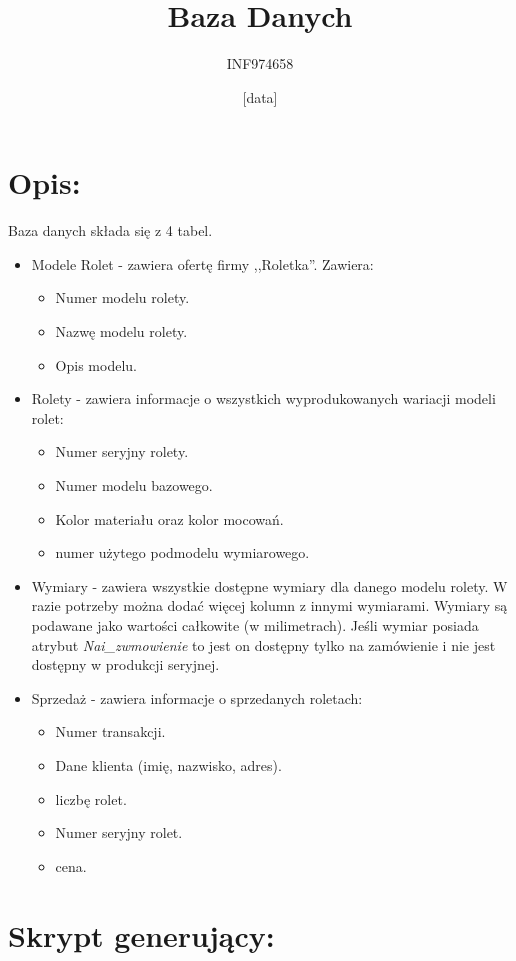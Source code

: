 \documentclass[a4paper,12pt]{article}
\title{Baza Danych}
\author{INF974658}
\date{[data]}
\begin{document}
\section{Opis:}

Baza danych składa się z 4 tabel.
\begin{itemize}
		\item Modele Rolet - zawiera ofertę firmy ,,Roletka''. Zawiera:
				\begin{itemize}
						\item Numer modelu rolety.
						\item Nazwę modelu rolety.
						\item Opis modelu.
				\end{itemize}
		\item Rolety - zawiera informacje o wszystkich wyprodukowanych wariacji modeli rolet:
				\begin{itemize}
						\item Numer seryjny rolety.
						\item Numer modelu bazowego.
						\item Kolor materiału oraz kolor mocowań.
						\item numer użytego podmodelu wymiarowego.
				\end{itemize}
		\item Wymiary - zawiera wszystkie dostępne wymiary dla danego modelu rolety. W razie potrzeby
				można dodać więcej kolumn z innymi wymiarami. Wymiary są podawane jako wartości całkowite
				(w milimetrach). Jeśli wymiar posiada atrybut \emph{Nai\_zwmowienie} to jest on dostępny tylko
				na zamówienie i nie jest dostępny w produkcji seryjnej.
		\item Sprzedaż - zawiera informacje o sprzedanych roletach:
				\begin{itemize}
						\item Numer transakcji.
						\item Dane klienta (imię, nazwisko, adres).
						\item liczbę rolet.
						\item Numer seryjny rolet.
						\item cena.
				\end{itemize}
\end{itemize}

\section{Skrypt generujący:}
\end{document}
